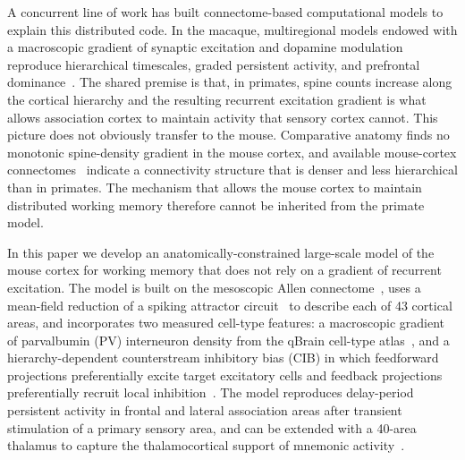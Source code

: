 A concurrent line of work has built connectome-based computational models to explain this distributed code. In the macaque, multiregional models endowed with a macroscopic gradient of synaptic excitation and dopamine modulation reproduce hierarchical timescales, graded persistent activity, and prefrontal dominance~\cite{murray2014hierarchy,mejias2022mechanisms,froudistwalsh2021dopamine}. The shared premise is that, in primates, spine counts increase along the cortical hierarchy and the resulting recurrent excitation gradient is what allows association cortex to maintain activity that sensory cortex cannot. This picture does not obviously transfer to the mouse. Comparative anatomy finds no monotonic spine-density gradient in the mouse cortex, and available mouse-cortex connectomes~\cite{oh2014mesoscale,gamanut2018mouse,knox2018highresolution,harris2019hierarchical} indicate a connectivity structure that is denser and less hierarchical than in primates. The mechanism that allows the mouse cortex to maintain distributed working memory therefore cannot be inherited from the primate model.

In this paper we develop an anatomically-constrained large-scale model of the mouse cortex for working memory that does not rely on a gradient of recurrent excitation. The model is built on the mesoscopic Allen connectome~\cite{oh2014mesoscale,harris2019hierarchical,knox2018highresolution}, uses a mean-field reduction of a spiking attractor circuit~\cite{wang2002probabilistic,wongwang2006recurrent} to describe each of 43 cortical areas, and incorporates two measured cell-type features: a macroscopic gradient of parvalbumin (PV) interneuron density from the qBrain cell-type atlas~\cite{kim2017braintype}, and a hierarchy-dependent counterstream inhibitory bias (CIB) in which feedforward projections preferentially excite target excitatory cells and feedback projections preferentially recruit local inhibition~\cite{mejias2022mechanisms,wang2020macroscopic}. The model reproduces delay-period persistent activity in frontal and lateral association areas after transient stimulation of a primary sensory area, and can be extended with a 40-area thalamus to capture the thalamocortical support of mnemonic activity~\cite{guo2017maintenance,bolkan2017thalamic,schmitt2017thalamic}.


